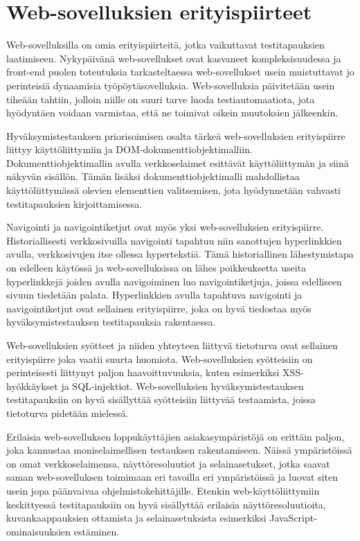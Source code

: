 \section{Web-sovelluksien erityispiirteet} \label{ch:08_websovelluksien_erityispiirteet}

  Web-sovelluksilla on omia erityispiirteitä, jotka vaikuttavat testitapauksien laatimiseen.
  Nykypäivänä web-sovellukset ovat kasvaneet kompleksisuudessa ja front-end puolen toteutuksia tarkasteltaessa web-sovellukset usein muistuttavat jo perinteisiä dynaamisia työpöytäsovelluksia.
  Web-sovelluksia päivitetään usein tiheään tahtiin, jolloin niille on suuri tarve luoda testiautomaatiota, jota hyödyntäen voidaan varmistaa, että ne toimivat oikein muutoksien jälkeenkin.

  Hyväksymistestauksen priorisoimisen osalta tärkeä web-sovelluksien erityispiirre liittyy käyttöliittymiin ja DOM-dokumenttiobjektimalliin.
  Dokumenttiobjektimallin avulla verkkoselaimet esittävät käyttöliittymän ja siinä näkyvän sisällön.
  Tämän lisäksi dokumenttiobjektimalli mahdollistaa käyttöliittymässä olevien elementtien valitsemisen, jota hyödynnetään vahvasti testitapauksien kirjoittamisessa.

  Navigointi ja navigointiketjut ovat myös yksi web-sovelluksien erityispiirre.
  Historiallisesti verkkosivuilla navigointi tapahtuu niin sanottujen hyperlinkkien avulla, verkkosivujen itse ollessa hypertekstiä.
  Tämä historiallinen lähestymistapa on edelleen käytössä ja web-sovelluksissa on lähes poikkeuksetta useita hyperlinkkejä joiden avulla navigoiminen luo navigointiketjuja, joissa edelliseen sivuun tiedetään palata.
  Hyperlinkkien avulla tapahtuva navigointi ja navigointiketjut ovat sellainen erityispiirre, joka on hyvä tiedostaa myös hyväksymistestauksen testitapauksia rakentaessa.

  Web-sovelluksien syötteet ja niiden yhteyteen liittyvä tietoturva ovat sellainen erityispiirre joka vaatii suurta huomiota.
  Web-sovelluksien syötteisiin on perinteisesti liittynyt paljon haavoittuvuuksia, kuten esimerkiksi XSS-hyökkäykset ja SQL-injektiot.
  Web-sovelluksien hyväksymistestauksen testitapauksiin on hyvä sisällyttää syötteisiin liittyvää testaamista, joissa tietoturva pidetään mielessä.

  Erilaisia web-sovelluksen loppukäyttäjien asiakasympäristöjä on erittäin paljon, joka kannustaa moniselaimellisen testauksen rakentamiseen.
  Näissä ympäristöissä on omat verkkoselaimensa, näyttöresoluutiot ja selainasetukset, jotka saavat saman web-sovelluksen toimimaan eri tavoilla eri ympäristöissä ja luovat siten usein jopa päänvaivaa ohjelmistokehittäjille.
  Etenkin web-käyttöliittymiin keskittyessä testitapauksiin on hyvä sisällyttää erilaisia näyttöresoluutioita, kuvankaappauksien ottamista ja selainasetuksista esimerkiksi JavaScript-ominaisuuksien estäminen.

